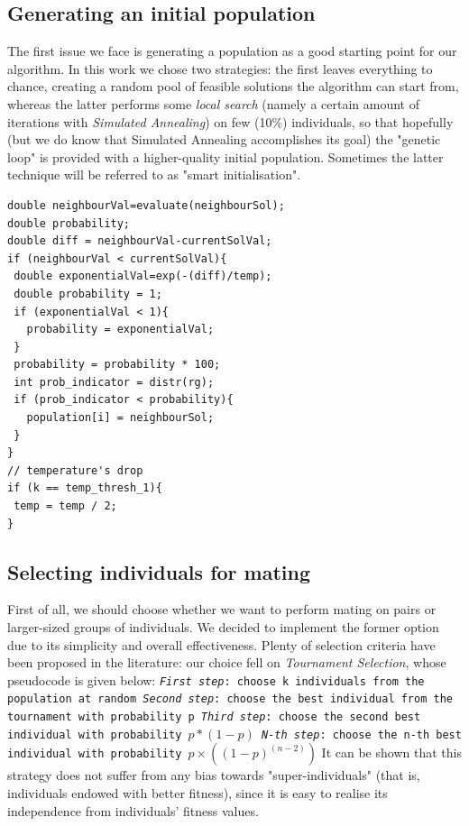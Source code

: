 \documentclass[letterpaper, 10 pt, conference]{ieeeconf}  %
\begin{document}
\subsection{Generating an initial population}
The first issue we face is generating a population as a good starting point for our algorithm. In this work we chose two strategies: the first leaves everything to chance, creating a random pool of feasible solutions the algorithm can start from, whereas the latter performs some \textit{local search} (namely a certain amount of iterations with \textit{Simulated Annealing}) on few (10\%) individuals, so that hopefully (but we do know that Simulated Annealing accomplishes its goal) the "genetic loop" is provided with a higher-quality initial population. Sometimes the latter technique will be referred to as "smart initialisation".
\begin{lstlisting}[caption={Code within main annealing loop, from \texttt{TSPPopulation.cpp}}]
double neighbourVal=evaluate(neighbourSol);   
double probability;
double diff = neighbourVal-currentSolVal;
if (neighbourVal < currentSolVal){
 double exponentialVal=exp(-(diff)/temp); 
 double probability = 1;
 if (exponentialVal < 1){
   probability = exponentialVal;
 }
 probability = probability * 100;    
 int prob_indicator = distr(rg);		
 if (prob_indicator < probability){   					
   population[i] = neighbourSol;
 }				
}
// temperature's drop
if (k == temp_thresh_1){
 temp = temp / 2;
}
\end{lstlisting}

\subsection{Selecting individuals for mating}
First of all, we should choose whether we want to perform mating on pairs
or larger-sized groups of individuals. We decided to implement the former option due to its simplicity and overall effectiveness. \newline
Plenty of selection criteria have been proposed in the literature: our choice fell on \textit{Tournament Selection}, whose pseudocode is given below: \newline\newline
\texttt{\textit{First step}: choose k individuals from the population at random
\newline \textit{Second step}: choose the best individual from the 
tournament with probability p
\newline \textit{Third step}: choose the second best individual 
with probability $p*(1-p)$
\newline \textit{N-th step}: choose the n-th best individual 
with probability $p\times((1-p)^{(n-2)})$}
\newline\newline
It can be shown that this strategy does not suffer from any bias towards "super-individuals" (that is, individuals endowed with better fitness), since it is easy to realise its independence from individuals' fitness values.
\end{document}
